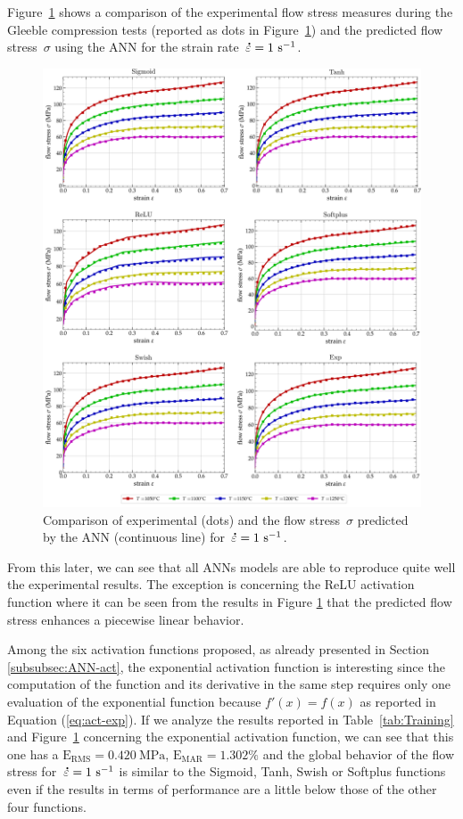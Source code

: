 \documentclass[algorithms,article,submit,pdftex,oneauthors]{Definitions/mdpi}
\DeclareRobustCommand{\mdot}[1]{\accentset{\mbox{\bfseries .}}{#1}}
\DeclareRobustCommand{\RMSE}{\text{E}_\text{RMS}}
\DeclareRobustCommand{\MARE}{\text{E}_\text{MAR}}
\DeclareRobustCommand{\ps}{\text{s}^{-1}}
\DeclareRobustCommand{\MPa}{\text{MPa}}
\begin{document}
Figure~\ref{fig:ANNFit} shows a comparison of the experimental flow stress measures during the Gleeble compression tests (reported as dots in Figure~\ref{fig:ANNFit}) and the predicted flow stress~$\sigma$ using the ANN for the strain rate~$\mdot{\varepsilon}=1~\ps$.
\begin{figure}[h!]
\centering
\includegraphics[width=0.95\columnwidth]{Figures/ANN-fit}
\caption{Comparison of experimental (dots) and the flow stress~$\sigma$ predicted by the ANN (continuous line) for~$\mdot{\varepsilon}=1~\ps$.}
\label{fig:ANNFit}
\end{figure}
From this later, we can see that all ANNs models are able to reproduce quite well the experimental results.
The exception is concerning the ReLU activation function where it can be seen from the results in Figure \ref{fig:ANNFit} that the predicted flow stress enhances a piecewise linear behavior.

Among the six activation functions proposed, as already presented in Section \ref{subsubsec:ANN-act}, the exponential activation function is interesting since the computation of the function and its derivative in the same step requires only one evaluation of the exponential function because $f'(x)=f(x)$ as reported in Equation (\ref{eq:act-exp}).
If we analyze the results reported in Table~\ref{tab:Training} and Figure~\ref{fig:ANNFit} concerning the exponential activation function, we can see that this one has a $\RMSE=0.420~\MPa$, $\MARE=1.302\%$ and the global behavior of the flow stress for~$\mdot{\varepsilon}=1~\ps$ is similar to the Sigmoid, Tanh, Swish or Softplus functions even if the results in terms of performance are a little below those of the other four functions.
\end{document}
